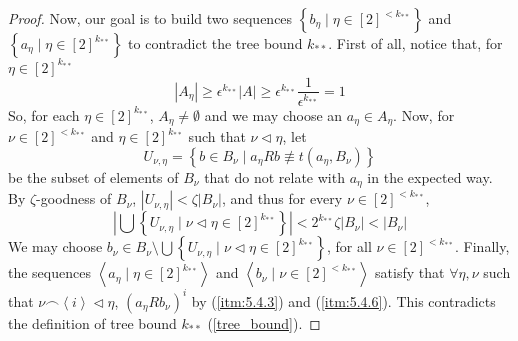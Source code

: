 \begin{proof}
            Now, our goal is to build two sequences $\left\{ b_\eta \mid \eta \in [2]^{<k_{**}} \right\}$ and
            $\left\{ a_\eta \mid \eta \in [2]^{k_{**}} \right\}$ to contradict the tree bound $k_{**}$.
            First of all, notice that, for $\eta \in [2]^{k_{**}}$
            \[
                |A_\eta| \geq \epsilon^{k_{**}} |A| \geq
                \epsilon^{k_{**}} \frac{1}{\epsilon^{k_{**}}} = 1
            \]
            So, for each $\eta \in [2]^{k_{**}}$, $A_\eta \neq \emptyset$ and we may choose an $a_\eta \in A_\eta$.
            Now, for $\nu \in [2]^{<k_{**}}$ and $\eta \in [2]^{k_{**}}$ such that $\nu \triangleleft \eta$, let
            \[
                U_{\nu,\eta} = \left\{ b \in B_\nu \mid a_\eta R b \not\equiv t(a_\eta, B_\nu) \right\}
            \]
            be the subset of elements of $B_\nu$ that do not relate with $a_\eta$ in the expected way.
            By $\zeta$-goodness of $B_\nu$, $|U_{\nu, \eta}| < \zeta |B_\nu|$, and thus for every $\nu \in [2]^{<k_{**}}$,
            \[
                \left|\bigcup\left\{ U_{\nu,\eta} \mid \nu \triangleleft \eta \in [2]^{k_{**}} \right\}\right| <
                2^{k_{**}} \zeta |B_\nu| < |B_\nu|
            \]
            We may choose $b_\nu \in B_\nu \setminus \bigcup\left\{ U_{\nu,\eta} \mid \nu \triangleleft \eta \in [2]^{k_{**}} \right\}$,
            for all $\nu \in [2]^{<k_{**}}$.
            Finally, the sequences $\left< a_\eta \mid \eta \in [2]^{k_{**}} \right>$ and $\left< b_\nu \mid \nu \in [2]^{<k_{**}} \right>$
            satisfy that $\forall \eta, \nu$ such that $\nu \frown \left< i \right> \triangleleft \eta$, $\left( a_\eta R b_\nu \right)^i$
            by (\ref{itm:5.4.3}) and (\ref{itm:5.4.6}).
            This contradicts the definition of tree bound $k_{**}$ (\ref{tree_bound}).
        \end{proof}

